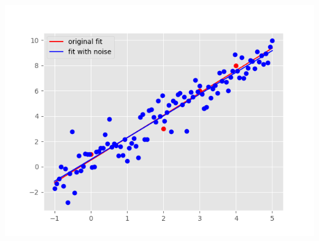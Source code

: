 \documentclass[12pt,letterpaper]{hmcpset}
\begin{document}
\begin{solution}
\begin{enumerate}
\includegraphics{hw1pr2d.png}
    \end{enumerate}


\end{solution}
\newpage
\end{document}
